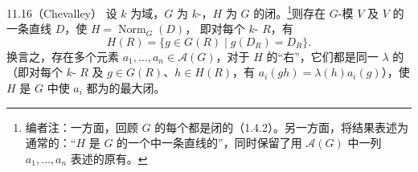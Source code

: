 \begin{SGAresult}{}{11.16（Chevalley）}
设 $k$ 为域，$G$ 为 $k$-，$H$ 为 $G$ 的闭。\footnote{编者注：一方面，回顾 $G$ 的每个都是闭的（1.4.2）。另一方面，将结果表述为通常的：“$H$ 是 $G$ 的一个中一条直线的”，同时保留了用 $\mathcal A(G)$ 中一列 $a_1,\ldots,a_n$ 表述的原有。}则存在 $G$-模 $V$ 及 $V$ 的一条直线 $D$，使 $H=\operatorname{Norm}_G(D)$，
即对每个 $k$- $R$，有
\[
H(R)=\{g\in G(R)\mid g(D_R)=D_R\}.
\]
换言之，存在多个元素 $a_1,\ldots,a_n\in\mathcal A(G)$，对于 $H$ 的“右”，它们都是同一 $\lambda$ 的（即对每个 $k$- $R$ 及 $g\in G(R)$、$h\in H(R)$，有 $a_i(gh)=\lambda(h)a_i(g)$），使 $H$ 是 $G$ 中使 $a_i$ 都为的最大闭。
\end{SGAresult}
